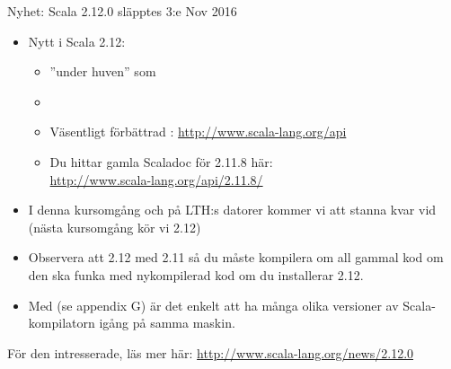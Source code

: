 


%
%


\ifkompendium\else

\begin{Slide}{Nyhet: Scala 2.12.0 släpptes 3:e Nov 2016}
\begin{itemize}
\item Nytt i Scala 2.12:
\begin{itemize}\SlideFontSmall
\item {} ''under huven'' som 
\item {} 
\item Väsentligt förbättrad : \url{http://www.scala-lang.org/api}
\item Du hittar gamla Scaladoc för 2.11.8 här: \\ \url{http://www.scala-lang.org/api/2.11.8/}

\end{itemize}
\item I denna kursomgång och på LTH:s datorer kommer vi att stanna kvar vid  (nästa kursomgång kör vi 2.12) 
\item Observera att 2.12  med 2.11 så du måste kompilera om all gammal kod om den ska funka med nykompilerad kod om du installerar 2.12.
\item Med  (se appendix G) är det enkelt att ha många olika versioner av Scala-kompilatorn igång på samma maskin.
\end{itemize}
{\SlideFontTiny För den intresserade, läs mer här: \url{http://www.scala-lang.org/news/2.12.0}}
\end{Slide}



